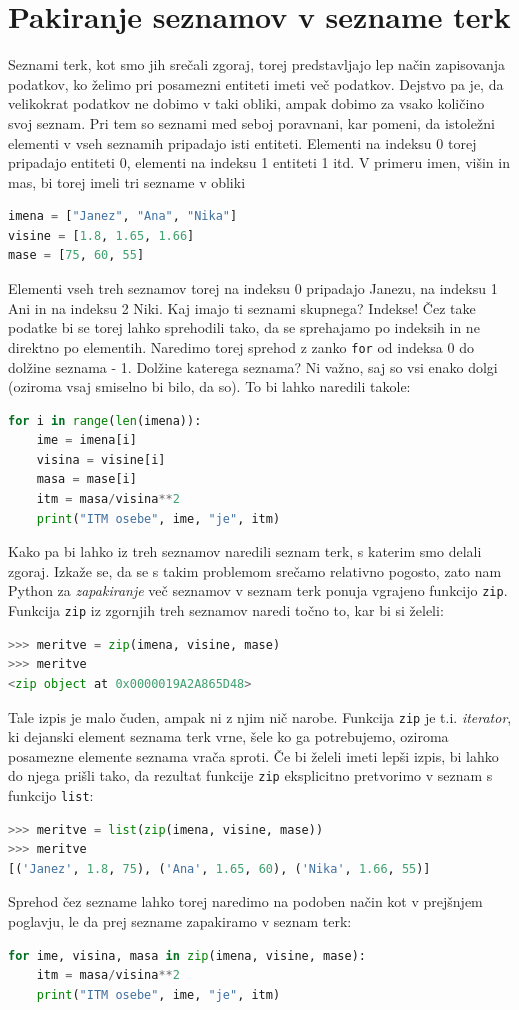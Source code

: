 \section{Pakiranje seznamov v sezname terk}
Seznami terk, kot smo jih srečali zgoraj, torej predstavljajo lep način zapisovanja podatkov, ko želimo pri posamezni entiteti imeti več podatkov. Dejstvo pa je, da velikokrat podatkov ne dobimo v taki obliki, ampak dobimo za vsako količino svoj seznam. Pri tem so seznami med seboj poravnani, kar pomeni, da istoležni elementi v vseh seznamih pripadajo isti entiteti. Elementi na indeksu 0 torej pripadajo entiteti 0, elementi na indeksu 1 entiteti 1 itd. V primeru imen, višin in mas, bi torej imeli tri sezname v obliki 
\begin{lstlisting}[language=Python]
imena = ["Janez", "Ana", "Nika"]
visine = [1.8, 1.65, 1.66]
mase = [75, 60, 55]
\end{lstlisting}
Elementi vseh treh seznamov torej na indeksu 0 pripadajo Janezu, na indeksu 1 Ani in na indeksu 2 Niki. Kaj imajo ti seznami skupnega? Indekse! Čez take podatke bi se torej lahko sprehodili tako, da se sprehajamo po indeksih in ne direktno po elementih. Naredimo torej sprehod z zanko \texttt{for} od indeksa 0 do dolžine seznama - 1. Dolžine katerega seznama? Ni važno, saj so vsi enako dolgi (oziroma vsaj smiselno bi bilo, da so). To bi lahko naredili takole:  
\begin{lstlisting}[language=Python]
for i in range(len(imena)):
    ime = imena[i]
    visina = visine[i]
    masa = mase[i]
    itm = masa/visina**2
    print("ITM osebe", ime, "je", itm)
\end{lstlisting}
Kako pa bi lahko iz treh seznamov naredili seznam terk, s katerim smo delali zgoraj. Izkaže se, da se s takim problemom srečamo relativno pogosto, zato nam Python za \emph{zapakiranje} več seznamov v seznam terk ponuja vgrajeno funkcijo \texttt{zip}. Funkcija \texttt{zip} iz zgornjih treh seznamov naredi točno to, kar bi si želeli: 
\begin{lstlisting}[language=Python]
>>> meritve = zip(imena, visine, mase)
>>> meritve
<zip object at 0x0000019A2A865D48>
\end{lstlisting}
Tale izpis je malo čuden, ampak ni z njim nič narobe. Funkcija \texttt{zip} je t.i. \emph{iterator}, ki dejanski element seznama terk vrne, šele ko ga potrebujemo, oziroma posamezne elemente seznama vrača sproti. Če bi želeli imeti lepši izpis, bi lahko do njega prišli tako, da rezultat funkcije \texttt{zip} eksplicitno pretvorimo v seznam s funkcijo \texttt{list}:
\begin{lstlisting}[language=Python]
>>> meritve = list(zip(imena, visine, mase))
>>> meritve
[('Janez', 1.8, 75), ('Ana', 1.65, 60), ('Nika', 1.66, 55)]
\end{lstlisting}
Sprehod čez sezname lahko torej naredimo na podoben način kot v prejšnjem poglavju, le da prej sezname zapakiramo v seznam terk:
\begin{lstlisting}[language=Python]
for ime, visina, masa in zip(imena, visine, mase):
    itm = masa/visina**2
    print("ITM osebe", ime, "je", itm)
\end{lstlisting}

